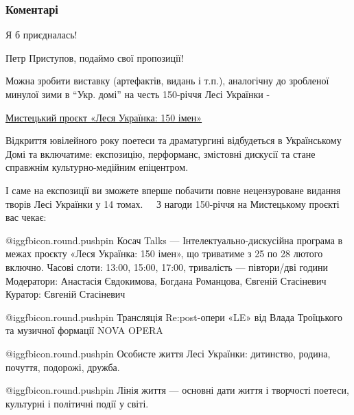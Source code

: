  
 
 
 
 
\subsubsection{Коментарі}

\begin{itemize} %
Я б приєдналась!

Петр Приступов, подаймо свої пропозиції!


Можна зробити виставку (артефактів, видань і т.п.), аналогічну до зробленої
минулої зими в \enquote{Укр. домі} на честь 150-річчя Лесі Українки - 

\href{https://www.facebook.com/events/779040659377151/}{%
Мистецький проєкт «Леся Українка: 150 імен»%
}

\begin{multicols}{2}

Відкриття ювілейного року поетеси та драматургині відбудеться в Українському
Домі та включатиме: експозицію, перформанс, змістовні дискусії та стане
справжнім культурно-медійним епіцентром.  ⠀

І саме на експозиції ви зможете вперше побачити повне нецензуроване видання
творів Лесі Українки у 14 томах.
⠀
З нагоди 150-річчя на Мистецькому проєкті вас чекає:

@igg{fbicon.round.pushpin}  Косач Talks — Інтелектуально-дискусійна програма в
межах проєкту «Леся Українка: 150 імен», що триватиме з 25 по 28 лютого
включно.  Часові слоти: 13:00, 15:00, 17:00, тривалість — півтори/дві години
Модератори: Анастасія Євдокимова, Богдана Романцова, Євгеній Стасіневич
Куратор: Євгеній Стасіневич

@igg{fbicon.round.pushpin}  Трансляція Re:post-опери «LE» від Влада Троїцького та музичної формації NOVA OPERA

@igg{fbicon.round.pushpin}  Особисте життя Лесі Українки: дитинство, родина, почуття, подорожі, дружба.

@igg{fbicon.round.pushpin}  Лінія життя — основні дати життя і творчості поетеси, культурні і політичні події у світі.


\end{multicols}
\end{itemize}
